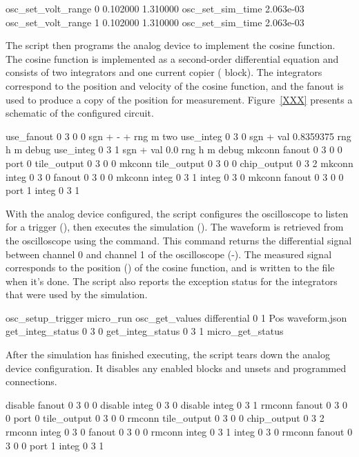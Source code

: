 \begin{snippet}
osc_set_volt_range 0 0.102000 1.310000
osc_set_sim_time 2.063e-03
osc_set_volt_range 1 0.102000 1.310000
osc_set_sim_time 2.063e-03
\end{snippet}

The \grendel script then programs the analog device to implement the cosine
function. The cosine function is implemented as a second-order differential
equation and consists of two integrators and one current copier (
block). The integrators correspond to the position and velocity of the cosine
function, and the fanout is used to produce a copy of the position for
measurement. Figure~\ref{XXX} presents a schematic of the configured circuit.

\begin{snippet}
use_fanout 0 3 0 0  sgn + - + rng m two
use_integ 0 3 0 sgn + val 0.8359375 rng h m debug
use_integ 0 3 1 sgn + val 0.0 rng h m debug
mkconn fanout 0 3 0 0 port 0 tile_output 0 3 0 0
mkconn tile_output 0 3 0 0 chip_output 0 3 2
mkconn integ 0 3 0 fanout 0 3 0 0
mkconn integ 0 3 1 integ 0 3 0
mkconn fanout 0 3 0 0 port 1 integ 0 3 1
\end{snippet}

With the analog device configured, the \grendel script configures the
oscilloscope to listen for a trigger (), then executes
the simulation (). The waveform is retrieved from the oscilloscope using the
 command. This command returns the differential signal
between channel 0 and channel 1 of the oscilloscope (-). The
measured signal corresponds to the position () of the cosine function,
and is written to the  file when it's done. The \grendel
script also reports the exception status for the integrators that were used by
the simulation. 

\begin{snippet}
osc_setup_trigger
micro_run
osc_get_values differential 0 1 Pos waveform.json
get_integ_status 0 3 0
get_integ_status 0 3 1
micro_get_status
\end{snippet}

After the simulation has finished executing, the \grendel script tears down the
analog device configuration. It disables any enabled blocks and unsets and
programmed connections.

\begin{snippet}
disable fanout 0 3 0 0
disable integ 0 3 0
disable integ 0 3 1
rmconn fanout 0 3 0 0 port 0 tile_output 0 3 0 0
rmconn tile_output 0 3 0 0 chip_output 0 3 2
rmconn integ 0 3 0 fanout 0 3 0 0
rmconn integ 0 3 1 integ 0 3 0
rmconn fanout 0 3 0 0 port 1 integ 0 3 1
\end{snippet}


